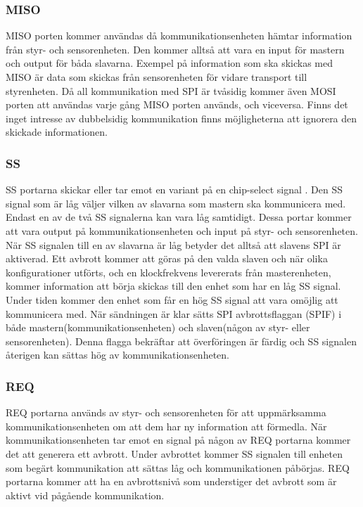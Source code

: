 \subsubsection{MISO}
MISO porten kommer användas då kommunikationsenheten hämtar information från styr- och sensorenheten. Den kommer alltså att vara en input för mastern och output för båda slavarna. Exempel på information som ska skickas med MISO är data som skickas från sensorenheten för vidare transport till styrenheten.
Då all kommunikation med SPI är tvåsidig kommer även MOSI porten att användas varje gång MISO porten används, och viceversa. Finns det inget intresse av dubbelsidig kommunikation finns möjligheterna att ignorera den skickade informationen.

\subsubsection{SS}
SS portarna skickar eller tar emot en variant på en chip-select signal . Den SS signal som är låg väljer vilken av slavarna som mastern ska kommunicera med. Endast en av de två SS signalerna kan vara låg samtidigt. Dessa portar kommer att vara output på kommunikationsenheten och input på styr- och sensorenheten.
När SS signalen till en av slavarna är låg betyder det alltså att slavens SPI är aktiverad. Ett avbrott kommer att göras på den valda slaven och när olika konfigurationer utförts, och en klockfrekvens levererats från masterenheten, kommer information att börja skickas till den enhet som har en låg SS signal. Under tiden kommer den enhet som får en hög SS signal att vara omöjlig att kommunicera med.
När sändningen är klar sätts SPI avbrottsflaggan (SPIF) i både mastern(kommunikationsenheten) och slaven(någon av styr- eller sensorenheten). Denna flagga bekräftar att överföringen är färdig och SS signalen återigen kan sättas hög av kommunikationsenheten.

\subsubsection{REQ}
REQ portarna används av styr- och sensorenheten för att uppmärksamma kommunikationsenheten om att dem har ny information att förmedla. När kommunikationsenheten tar emot en signal på någon av REQ portarna kommer det att generera ett avbrott. Under avbrottet kommer SS signalen till enheten som begärt kommunikation att sättas låg och kommunikationen påbörjas.  REQ portarna kommer att ha en avbrottsnivå som understiger det avbrott som är aktivt vid pågående kommunikation.

